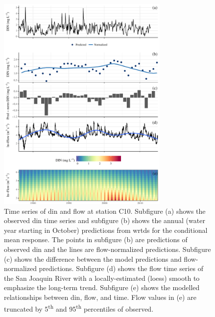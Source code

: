 \documentclass[journal = esthag, manuscript = article]{achemso}\usepackage[]{graphicx}\usepackage[]{color}
\begin{document}
\begin{figure}[!ht]

{\centering \includegraphics[width=0.75\textwidth]{figs/dinc10-1} 

}

\caption{Time series of \ac{din} and flow at station C10.  Subfigure (a) shows the observed \ac{din} time series and subfigure (b) shows the annual (water year starting in October) predictions from \ac{wrtds} for the conditional mean response.  The points in subfigure (b) are predictions of observed \ac{din} and the lines are flow-normalized predictions.  Subfigure (c) shows the difference between the model predictions and flow-normalized predictions.  Subfigure (d) shows the flow time series of the San Joaquin River with a locally-estimated (loess) smooth to emphasize the long-term trend. Subfigure (e) shows the modelled relationships between \ac{din}, flow, and time. Flow values in (e) are truncated by 5\textsuperscript{th} and 95\textsuperscript{th} percentiles of observed.}\label{fig:dinc10}
\end{figure}
\end{document}
